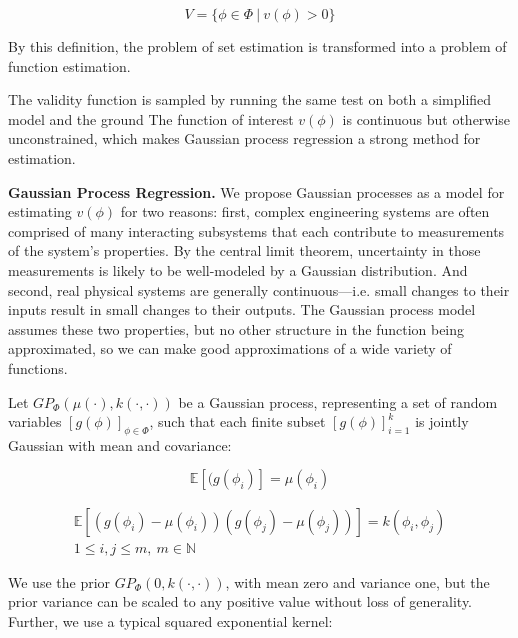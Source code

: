 \documentclass[12pt, conference]{IEEEtran}
\begin{document}
\begin{equation}
    V=\{\phi\in\Phi\ |\ v(\phi)>0\}
\end{equation}

By this definition, the problem of set estimation is transformed into a problem of function estimation.

The validity function is sampled by running the same test on both a simplified model and the ground The function of interest $v(\phi)$ is continuous but otherwise unconstrained, which makes Gaussian process regression a strong method for estimation. 
\linebreak

\noindent\textbf{Gaussian Process Regression.} We propose Gaussian processes as a model for estimating $v(\phi)$ for two reasons: first, complex engineering systems are often comprised of many interacting subsystems that each contribute to measurements of the system's properties. By the central limit theorem, uncertainty in those measurements is likely to be well-modeled by a Gaussian distribution. And second, real physical systems are generally continuous---i.e. small changes to their inputs result in small changes to their outputs. The Gaussian process model assumes these two properties, but no other structure in the function being approximated, so we can make good approximations of a wide variety of functions.

Let $GP_\Phi(\mu(\cdot),k(\cdot,\cdot))$ be a Gaussian process, representing a set of random variables $[g(\phi)]_{\phi\in\Phi}$, such that each finite subset $[g(\phi)]_{i=1}^k$ is jointly Gaussian with mean and covariance:

\begin{equation}
    \mathbb{E}[(g(\phi_i)] = \mu(\phi_i)
    \label{eq:jointmean}
\end{equation}

\begin{multline}
    \mathbb{E}[(g(\phi_i)-\mu(\phi_i))(g(\phi_j)-\mu(\phi_j))]=k(\phi_i,\phi_j) \\
    1\leq i,j\leq m,\ m\in \mathbb{N}
    \label{eq:jointcov}
\end{multline}
\smallskip

We use the prior $GP_\Phi(0,k(\cdot,\cdot))$, with mean zero and variance one, but the prior variance can be scaled to any positive value without loss of generality. Further, we use a typical squared exponential kernel:
\end{document}
